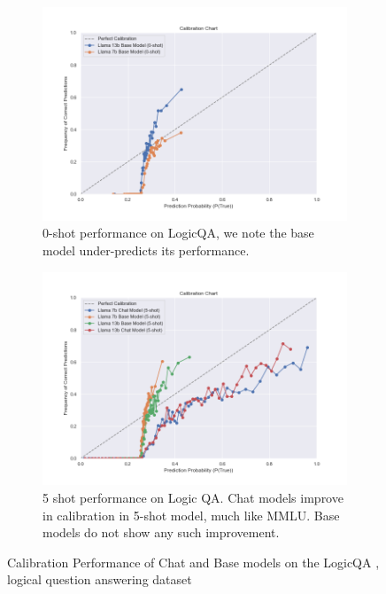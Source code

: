 \documentclass[11pt]{article}
\begin{document}
\begin{figure}
     \centering
     \begin{subfigure}[b]{0.49\textwidth}
         \centering \includegraphics[width=1.3\textwidth]{figures/0-shot-logic-qa.png}
         \caption{0-shot performance on LogicQA, we note the base model under-predicts its performance.}
         \label{fig:0-shot-MMLU}
     \end{subfigure}
     \hfill
     \begin{subfigure}[b]{0.49\textwidth}
         \centering
         \includegraphics[width=1.3\textwidth]{figures/5-shot-logic-qa.png}
         \caption{5 shot performance on Logic QA. Chat models improve in calibration in 5-shot model, much like MMLU. Base models do not show any such improvement.}
         \label{fig:5-shot-logicqa}
     \end{subfigure}     
        \caption{Calibration Performance of Chat and Base models on the LogicQA , logical question answering dataset}
        \label{fig:three graphs}
\end{figure}
\end{document}
